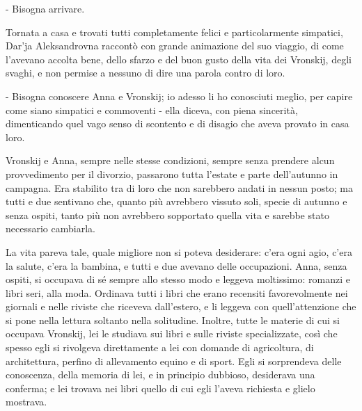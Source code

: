 - Bisogna arrivare. 

Tornata a casa e trovati tutti completamente felici e particolarmente simpatici, Dar'ja Aleksandrovna raccontò con grande animazione del suo viaggio, di come l'avevano accolta bene, dello sfarzo e del buon gusto della vita dei Vronskij, degli svaghi, e non permise a nessuno di dire una parola contro di loro. 

- Bisogna conoscere Anna e Vronskij; io adesso li ho conosciuti meglio, per capire come siano simpatici e commoventi - ella diceva, con piena sincerità, dimenticando quel vago senso di scontento e di disagio che aveva provato in casa loro. 

Vronskij e Anna, sempre nelle stesse condizioni, sempre senza prendere alcun provvedimento per il divorzio, passarono tutta l'estate e parte dell'autunno in campagna. Era stabilito tra di loro che non sarebbero andati in nessun posto; ma tutti e due sentivano che, quanto più avrebbero vissuto soli, specie di autunno e senza ospiti, tanto più non avrebbero sopportato quella vita e sarebbe stato necessario cambiarla. 

La vita pareva tale, quale migliore non si poteva desiderare: c'era ogni agio, c'era la salute, c'era la bambina, e tutti e due avevano delle occupazioni. Anna, senza ospiti, si occupava di sé sempre allo stesso modo e leggeva moltissimo: romanzi e libri seri, alla moda. Ordinava tutti i libri che erano recensiti favorevolmente nei giornali e nelle riviste che riceveva dall'estero, e li leggeva con quell'attenzione che si pone nella lettura soltanto nella solitudine. Inoltre, tutte le materie di cui si occupava Vronskij, lei le studiava sui libri e sulle riviste specializzate, così che spesso egli si rivolgeva direttamente a lei con domande di agricoltura, di architettura, perfino di allevamento equino e di sport. Egli si sorprendeva delle conoscenza, della memoria di lei, e in principio dubbioso, desiderava una conferma; e lei trovava nei libri quello di cui egli l'aveva richiesta e glielo mostrava. 

